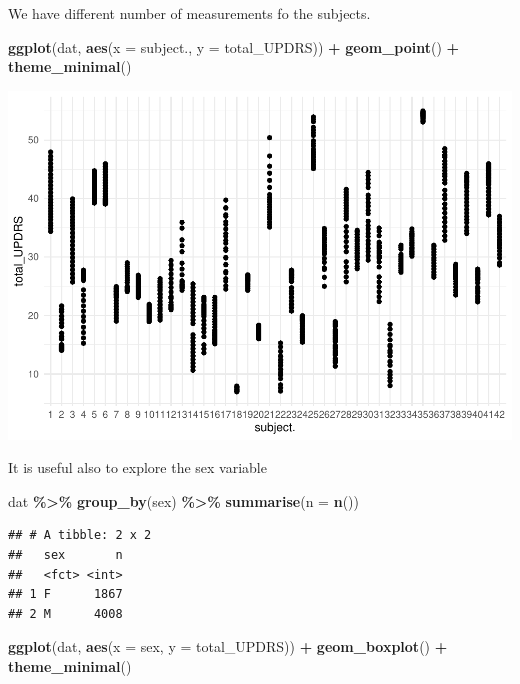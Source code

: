 \documentclass[
]{article}
\newenvironment{Shaded}{\begin{snugshade}}{\end{snugshade}}
\newcommand{\AttributeTok}[1]{\textcolor[rgb]{0.13,0.29,0.53}{#1}}
\newcommand{\FunctionTok}[1]{\textcolor[rgb]{0.13,0.29,0.53}{\textbf{#1}}}
\newcommand{\NormalTok}[1]{#1}
\newcommand{\SpecialCharTok}[1]{\textcolor[rgb]{0.81,0.36,0.00}{\textbf{#1}}}
\begin{document}
We have different number of measurements fo the subjects.

\begin{Shaded}
\begin{Highlighting}[]
\FunctionTok{ggplot}\NormalTok{(dat, }\FunctionTok{aes}\NormalTok{(}\AttributeTok{x =}\NormalTok{ subject., }\AttributeTok{y =}\NormalTok{ total\_UPDRS)) }\SpecialCharTok{+}
  \FunctionTok{geom\_point}\NormalTok{() }\SpecialCharTok{+} 
  \FunctionTok{theme\_minimal}\NormalTok{()}
\end{Highlighting}
\end{Shaded}

\includegraphics{Data_Exploration_files/figure-latex/unnamed-chunk-9-1.pdf}

It is useful also to explore the sex variable

\begin{Shaded}
\begin{Highlighting}[]
\NormalTok{dat }\SpecialCharTok{\%\textgreater{}\%} \FunctionTok{group\_by}\NormalTok{(sex) }\SpecialCharTok{\%\textgreater{}\%} \FunctionTok{summarise}\NormalTok{(}\AttributeTok{n =} \FunctionTok{n}\NormalTok{())}
\end{Highlighting}
\end{Shaded}

\begin{verbatim}
## # A tibble: 2 x 2
##   sex       n
##   <fct> <int>
## 1 F      1867
## 2 M      4008
\end{verbatim}

\begin{Shaded}
\begin{Highlighting}[]
\FunctionTok{ggplot}\NormalTok{(dat, }\FunctionTok{aes}\NormalTok{(}\AttributeTok{x =}\NormalTok{ sex, }\AttributeTok{y =}\NormalTok{ total\_UPDRS)) }\SpecialCharTok{+}
  \FunctionTok{geom\_boxplot}\NormalTok{() }\SpecialCharTok{+} 
  \FunctionTok{theme\_minimal}\NormalTok{()}
\end{Highlighting}
\end{Shaded}
\end{document}
